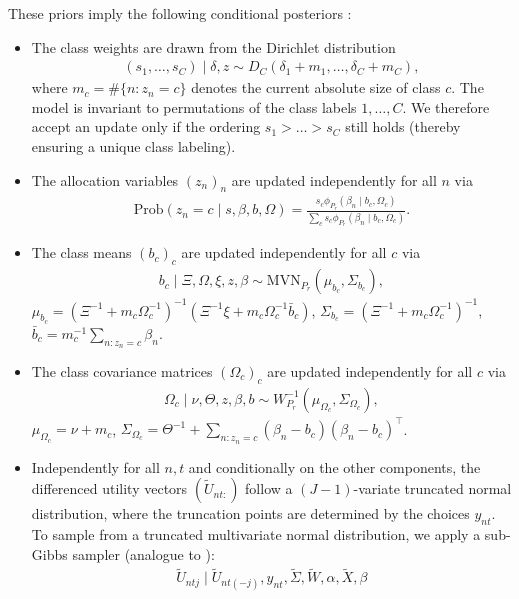\documentclass[article,shortnames]{jss}
\begin{document}
These priors imply the following conditional posteriors \citep{Oelschlaeger:2020}:
\begin{itemize}
  \item The class weights are drawn from the Dirichlet distribution
  \begin{align*}
  (s_1,\dots,s_C)\mid \delta,z \sim D_C(\delta_1+m_1,\dots,\delta_C+m_C),
  \end{align*}
  where $m_c=\#\{n:z_n=c\}$ denotes the current absolute size of class $c$. The model is invariant to permutations of the class labels $1,\dots,C$. We therefore accept an update only if the ordering $s_1>\dots>s_C$ still holds (thereby ensuring a unique class labeling).
  \item The allocation variables $(z_n)_n$ are updated independently for all $n$ via
  \begin{align*}
  \text{Prob}(z_n=c\mid s,\beta,b,\Omega )=\frac{s_c\phi_{P_r}(\beta_n\mid b_c,\Omega_c)}{\sum_c s_c\phi_{P_r}(\beta_n\mid b_c,\Omega_c)}.
  \end{align*}
  \item The class means $(b_c)_c$ are updated independently for all $c$ via
  \begin{align*}
  b_c\mid \Xi,\Omega,\xi,z,\beta \sim\text{MVN}_{P_r}\left( \mu_{b_c}, \Sigma_{b_c}  \right),
  \end{align*}
  $\mu_{b_c}=(\Xi^{-1}+m_c\Omega_c^{-1})^{-1}(\Xi^{-1}\xi +m_c\Omega_c^{-1}\bar{b}_c)$, $\Sigma_{b_c}=(\Xi^{-1}+m_c\Omega_c^{-1})^{-1}$, $\bar{b}_c=m_c^{-1}\sum_{n:z_n=c} \beta_n$.
    \item The class covariance matrices $(\Omega_c)_c$ are updated independently for all $c$ via
  \begin{align*}
  \Omega_c \mid \nu,\Theta,z,\beta,b \sim W^{-1}_{P_r}(\mu_{\Omega_c},\Sigma_{\Omega_c}),
  \end{align*}
  $\mu_{\Omega_c}=\nu+m_c$, $\Sigma_{\Omega_c}=\Theta^{-1} + \sum_{n:z_n=c} (\beta_n-b_c)(\beta_n-b_c)^\top$.
  \item Independently for all $n,t$ and conditionally on the other components, the differenced utility vectors $(\tilde{U}_{nt:})$ follow a $(J-1)$-variate truncated normal distribution, where the truncation points are determined by the choices $y_{nt}$. To sample from a truncated multivariate normal distribution, we apply a sub-Gibbs sampler (analogue to \cite{Geweke:1998}):
  \begin{align*}
  \tilde{U}_{ntj} \mid \tilde{U}_{nt(-j)},y_{nt},\tilde{\Sigma},\tilde{W},\alpha,\tilde{X},\beta

\end{align*}
\end{itemize}
\end{document}
